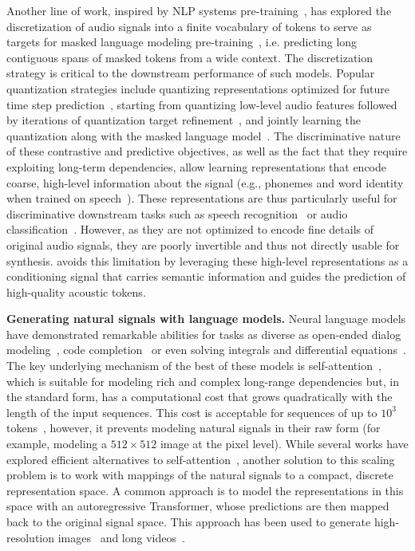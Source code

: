 \documentclass[letterpaper,10 pt]{IEEEtran}
\begin{document}
Another line of work, inspired by NLP systems pre-training~\cite{bert,roberts2022t5x}, has explored the  discretization of audio signals into a finite vocabulary of tokens to serve as targets for masked language modeling pre-training~\cite{bert}, i.e. predicting long contiguous spans of masked tokens from a wide context. The discretization strategy is critical to the downstream performance of such models. Popular quantization strategies include quantizing representations optimized for future time step prediction~\cite{vqwav2vec}, starting from quantizing low-level audio features followed by iterations of quantization target refinement~\cite{hubert}, and jointly learning the quantization along with the masked language model~\cite{w2vbert}. The discriminative nature of these contrastive and predictive objectives, as well as the fact that they require exploiting long-term dependencies, allow learning representations that encode coarse, high-level information about the signal (e.g., phonemes and word identity when trained on speech~\cite{pasad2021}). These representations are thus particularly useful for discriminative downstream tasks such as speech recognition~\cite{hubert} or audio classification~\cite{cola}. However, as they are not optimized to encode fine details of original audio signals, they are poorly invertible and thus not directly usable for synthesis. \ours{} avoids this limitation by leveraging these high-level representations as a conditioning signal that carries semantic information and guides the prediction of high-quality acoustic tokens.

\noindent
\textbf{Generating natural signals with language models.}  Neural language models have demonstrated remarkable abilities for tasks as diverse as open-ended dialog modeling~\cite{lamda}, code completion~\cite{openaicodex} or even solving integrals and differential equations~\cite{symbolic_math_lample}. The key underlying mechanism of the best of these models is self-attention~\cite{attentionvaswani}, which is suitable for modeling rich and complex long-range dependencies but, in the standard form, has a computational cost that grows quadratically with the length of the input sequences. This cost is acceptable for sequences of up to $10^3$ tokens~\cite{t5}, however, it prevents modeling natural signals in their raw form (for example, modeling a $512\times512$ image at the pixel level). While several works have explored efficient alternatives to self-attention~\cite{routing_transformer,performer,perceiverar2022}, another solution to this scaling problem is to work with mappings of the natural signals to a compact, discrete representation space. A common approach is to model the representations in this space with an autoregressive Transformer, whose predictions are then mapped back to the original signal space. This approach has been used to generate high-resolution images~\cite{tamingtransformers,vit-vqgan2021,parti} and long videos~\cite{tats}. 
\end{document}
